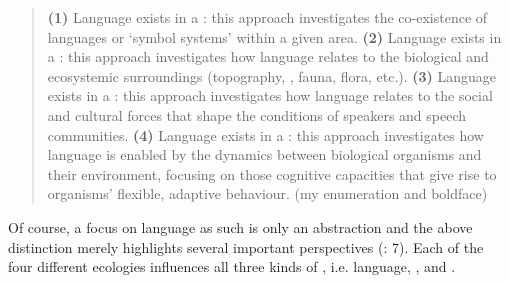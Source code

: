 \begin{quote}
\textbf{(1)} Language exists in a \textbf{}: this approach investigates the co-exis\-tence of languages or ‘symbol systems’ within a given area. \textbf{(2)} Language exists in a \textbf{}: this approach investigates how language relates to the biological and ecosystemic surroundings (topography, , fauna, flora, etc.). \textbf{(3)} Language exists in a \textbf{}: this approach investigates how language relates to the social and cultural forces that shape the conditions of speakers and speech communities. \textbf{(4)} Language exists in a \textbf{}: this approach investigates how language is enabled by the dynamics between biological organisms and their environment, focusing on those cognitive capacities that give rise to organisms’ flexible, adaptive behaviour. (my enumeration and boldface)
\end{quote}

\noindent Of course, a focus on language as such is only an abstraction and the above distinction merely highlights several important perspectives (\citealt{SteffensenFill2014}: 7). Each of the four different ecologies influences all three kinds of , i.e. language, , and .

